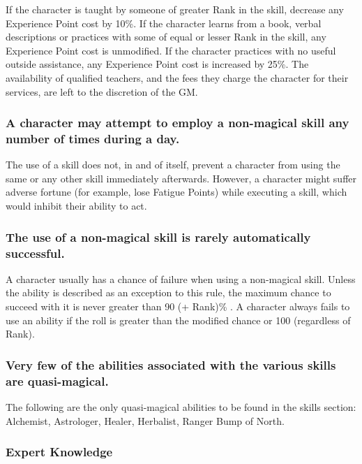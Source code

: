 \begin{multicols*}{3}
If the character is taught by someone of greater Rank in the skill,
decrease any Experience Point cost by 10\%.  If the character learns
from a book, verbal descriptions or practices with some of equal or
lesser Rank in the skill, any Experience Point cost is unmodified.  If
the character practices with no useful outside assistance, any
Experience Point cost is increased by 25\%.  The availability of
qualified teachers, and the fees they charge the character for their
services, are left to the discretion of the GM.

\subsubsection{A character may attempt to employ a non-magical skill any
number of times during a day.}

The use of a skill does not, in and of itself, prevent a character
from using the same or any other skill immediately afterwards.
However, a character might suffer adverse fortune (for example, lose
Fatigue Points) while executing a skill, which would inhibit their
ability to act.

\subsubsection{The use of a non-magical skill is rarely automatically
successful.}

A character usually has a chance of failure when using a non-magical
skill.  Unless the ability is described as an exception to this rule,
the maximum chance to succeed with it is never greater than 90 (+
Rank)\% .  A character always fails to use an ability if the roll is
greater than the modified chance or 100 (regardless of Rank).

\subsubsection{Very few of the abilities associated with the various skills
are quasi-magical.}

The following are the only quasi-magical abilities to be found in the
skills section: Alchemist, Astrologer, Healer, Herbalist, Ranger Bump
of North.

\subsubsection{Expert Knowledge}


\end{multicols*}
